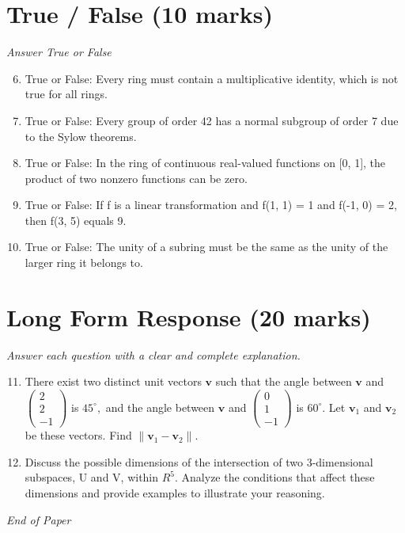 \documentclass[12pt]{article}
\begin{document}
\section*{True / False (10 marks)}
\textit{Answer True or False}
\begin{enumerate}[label=\arabic*.]
\setcounter{enumi}{5}
\item True or False: Every ring must contain a multiplicative identity, which is not true for all rings.
\item True or False: Every group of order 42 has a normal subgroup of order 7 due to the Sylow theorems.
\item True or False: In the ring of continuous real-valued functions on [0, 1], the product of two nonzero functions can be zero.
\item True or False: If f is a linear transformation and f(1, 1) = 1 and f(-1, 0) = 2, then f(3, 5) equals 9.
\item True or False: The unity of a subring must be the same as the unity of the larger ring it belongs to.
\end{enumerate}

\section*{Long Form Response (20 marks)}
\textit{Answer each question with a clear and complete explanation.}
\begin{enumerate}[label=\arabic*.]
\setcounter{enumi}{10}
\item There exist two distinct unit vectors $\mathbf{v}$ such that the angle between $\mathbf{v}$ and $\begin{pmatrix} 2 \\ 2 \\ -1 \end{pmatrix}$ is $45^\circ,$ and the angle between $\mathbf{v}$ and $\begin{pmatrix} 0 \\ 1 \\ -1 \end{pmatrix}$ is $60^\circ.$ Let $\mathbf{v}_1$ and $\mathbf{v}_2$ be these vectors. Find $\|\mathbf{v}_1 - \mathbf{v}_2\|.$
\item Discuss the possible dimensions of the intersection of two 3-dimensional subspaces, U and V, within $R^5$. Analyze the conditions that affect these dimensions and provide examples to illustrate your reasoning.
\end{enumerate}

\vfill
\noindent\textit{End of Paper}
\end{document}
